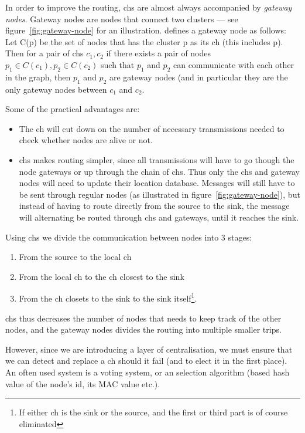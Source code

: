 In order to improve the routing, \acp{ch} are almost always accompanied by \emph{gateway nodes}. Gateway nodes are nodes that connect two clusters --- see figure~\ref{fig:gateway-node} for an illustration. \cite{spanners} defines a gateway node as follows:
Let C(p) be the set of nodes that has the cluster p as its \ac{ch} (this includes p). Then for a pair of \acp{ch} $c_1, c_2$ if there exists a pair of nodes $p_1 \in C(c_1), p_2 \in C(c_2)$ such that $p_1$ and $p_2$ can communicate with each other in the graph, then $p_1$ and $p_2$ are gateway nodes (and in particular they are the only gateway nodes between $c_1$ and $c_2$.  

Some of the practical advantages are:
\begin{itemize}
\item The \ac{ch} will cut down on the number of necessary transmissions needed to check whether nodes are alive or not.
\item \acp{ch} makes routing simpler, since all transmissions will have to go though the node gateways or up through the chain of \acp{ch}. Thus only the \acp{ch} and gateway nodes will need to update their location database. Messages will still have to be sent through regular nodes (as illustrated in figure~\ref{fig:gateway-node}), but instead of having to route directly from the source to the sink, the message will alternating be routed through \acp{ch} and gateways, until it reaches the sink.
\end{itemize}

Using \acp{ch} we divide the communication between nodes into 3 stages:
\begin{enumerate}
\item From the source to the local \ac{ch} 
\item From the local \ac{ch} to the \ac{ch} closest to the sink
\item From the \ac{ch} closets to the sink to the sink itself\footnote{If either \ac{ch} is the sink or the source, and the first or third part is of course eliminated}.
\end{enumerate}
 \acp{ch} thus decreases the number of nodes that needs to keep track of the other nodes, and the gateway nodes divides the routing into multiple smaller trips.  

However, since we are introducing a layer of centralisation, we must ensure that we can detect and replace a \ac{ch} should it fail (and to elect it in the first place). An often used system is a voting system, or an selection algorithm (based hash value of the node's id, its MAC value etc.).

